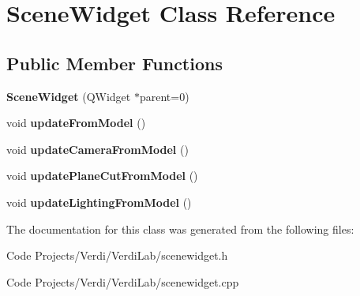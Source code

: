 \hypertarget{class_scene_widget}{\section{\-Scene\-Widget \-Class \-Reference}
\label{class_scene_widget}
}
\subsection*{\-Public \-Member \-Functions}
\begin{DoxyCompactItemize}
\item 
\hypertarget{class_scene_widget_a170da981f29dc571824508f6c7e414b3}{{\bfseries \-Scene\-Widget} (\-Q\-Widget $\ast$parent=0)}\label{class_scene_widget_a170da981f29dc571824508f6c7e414b3}

\item 
\hypertarget{class_scene_widget_a75ec9f199937bb79e7aa19d671ec3b79}{void {\bfseries update\-From\-Model} ()}\label{class_scene_widget_a75ec9f199937bb79e7aa19d671ec3b79}

\item 
\hypertarget{class_scene_widget_ad5e5285009fa9b064e64c4a9243fd83d}{void {\bfseries update\-Camera\-From\-Model} ()}\label{class_scene_widget_ad5e5285009fa9b064e64c4a9243fd83d}

\item 
\hypertarget{class_scene_widget_a708b4d64afd47e30f26726c966a470f0}{void {\bfseries update\-Plane\-Cut\-From\-Model} ()}\label{class_scene_widget_a708b4d64afd47e30f26726c966a470f0}

\item 
\hypertarget{class_scene_widget_a3a55b4297a16d98eadcfdd2293fe50a2}{void {\bfseries update\-Lighting\-From\-Model} ()}\label{class_scene_widget_a3a55b4297a16d98eadcfdd2293fe50a2}

\end{DoxyCompactItemize}


\-The documentation for this class was generated from the following files\-:\begin{DoxyCompactItemize}
\item 
\-Code Projects/\-Verdi/\-Verdi\-Lab/scenewidget.\-h\item 
\-Code Projects/\-Verdi/\-Verdi\-Lab/scenewidget.\-cpp\end{DoxyCompactItemize}
